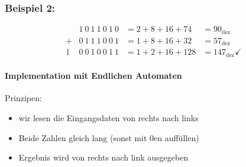 \documentclass[a4paper]{scrartcl}
\begin{document}
\subsubsection{Beispiel 2:}
\label{sec-5-3-3}
\begin{align}
&1~0~1~1~0~1~0 &= 2 + 8 + 16 + 74 &= 90_{\text{dez}} \\
+&0~1~1~1~0~0~1 &= 1 + 8 + 16 + 32 &= 57_{\text{dez}} \\
\hline
1~&0~0~1~0~0~1~1 &= 1 + 2 + 16 + 128 &= 147_{\text{dez}}\checkmark
\end{align}
\paragraph{Implementation mit Endlichen Automaten}
\label{sec-5-3-3-1}
Prinzipen:
\begin{itemize}
\item wir lesen die Eingangsdaten von rechts nach links
\item Beide Zahlen gleich lang (sonst mit 0en auffüllen)
\item Ergebnis wird von rechts nach link ausgegeben
\end{itemize}
\end{document}
